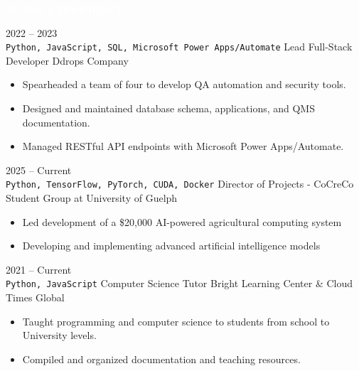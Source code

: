 \documentclass[9pt]{src/developercv} %
\begin{document}

\vspace{\baselineskip} %
\colorbox{sky900}{\textcolor{white}{\LARGE\MakeUppercase{\textbf{Work Experience}}}}
\vspace{1.0\baselineskip}%

\begin{entrylist}
	\entry
		{2022 -- 2023\\\small{\texttt{Python, JavaScript, SQL, Microsoft Power Apps/Automate}}}
		{Lead Full-Stack Developer}
		{Ddrops Company}
		{
			\vspace{-1.0\baselineskip}%
			\begin{itemize}
				\item Spearheaded a team of four to develop QA automation and security tools.
				\item Designed and maintained database schema, applications, and QMS documentation.
				\item Managed RESTful API endpoints with Microsoft Power Apps/Automate.
			\end{itemize}
		}
	\entry
		{2025 -- Current\\\small{\texttt{Python, TensorFlow, PyTorch, CUDA, Docker}}}
		{Director of Projects - }
		{CoCreCo Student Group at University of Guelph}
		{
			\vspace{-1.0\baselineskip}%
			\begin{itemize}
				\item Led development of a \$20,000 AI-powered agricultural computing system
				\item Developing and implementing advanced artificial intelligence models
			\end{itemize}
		}
	\entry
		{2021 -- Current\\\small{\texttt{Python, JavaScript}}}
		{Computer Science Tutor}
		{Bright Learning Center \& Cloud Times Global}
		{
			\vspace{-1.0\baselineskip}%
			\begin{itemize}
				\item Taught programming and computer science to students from school to University levels.
				\item Compiled and organized documentation and teaching resources.

\end{itemize}}
\end{entrylist}
\end{document}
